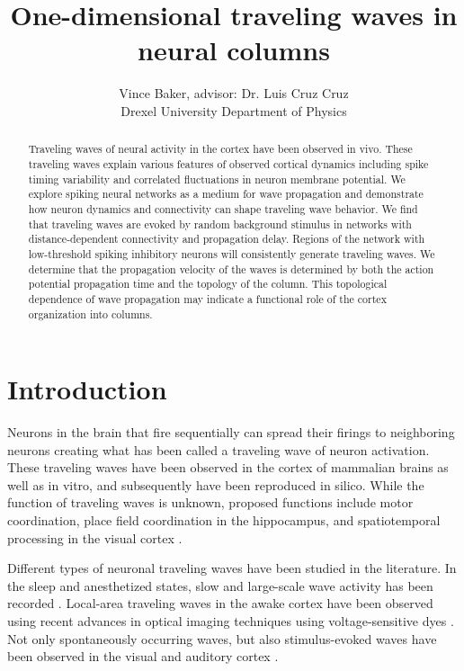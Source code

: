 \documentclass[a4paper,11pt]{article}
\title{One-dimensional traveling waves in neural columns}
\author{Vince Baker, advisor: Dr. Luis Cruz Cruz\\ Drexel University Department of Physics}
\begin{document}
\maketitle

\begin{abstract}
Traveling waves of neural activity in the cortex have been observed in vivo.
These traveling waves explain various features of observed cortical dynamics including spike timing variability and correlated fluctuations in neuron membrane potential.
We explore spiking neural networks as a medium for wave propagation and demonstrate how neuron dynamics and connectivity can shape traveling wave behavior.
We find that traveling waves are evoked by random background stimulus in networks with distance-dependent connectivity and propagation delay.
Regions of the network with low-threshold spiking inhibitory neurons will consistently generate traveling waves.
We determine that the propagation velocity of the waves is determined by both the action potential propagation time and the topology of the column.
This topological dependence of wave propagation may indicate a functional role of the cortex organization into columns.

\end{abstract}

\section{Introduction} 
Neurons in the brain that fire sequentially can spread their firings to neighboring neurons creating what has been called a traveling wave of neuron activation. 
These traveling waves have been observed in the cortex of mammalian brains as well as in vitro, and subsequently have been reproduced in silico. 
While the function of traveling waves is unknown, proposed functions include motor coordination, place field coordination in the hippocampus, and spatiotemporal processing in the visual cortex \cite{muller2018}. 

Different types of neuronal traveling waves have been studied in the literature. 
In the sleep and anesthetized states, slow and large-scale wave activity has been recorded \cite{muller2018}. 
Local-area traveling waves in the awake cortex have been observed using recent advances in optical imaging techniques using voltage-sensitive dyes \cite{wu2008}. 
Not only spontaneously occurring waves, but also stimulus-evoked waves have been observed in the visual and auditory cortex \cite{reimer2010}\cite{muller2018}.
\end{document}
